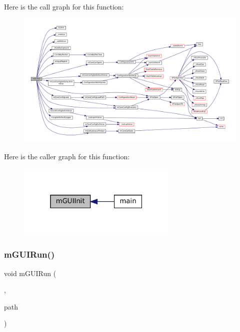 Here is the call graph for this function\+:
\nopagebreak
\begin{figure}[H]
\begin{center}
\leavevmode
\includegraphics[width=350pt]{gui-runner_8h_ad34949b1a8eea99a01dd34345c87f8a4_cgraph}
\end{center}
\end{figure}
Here is the caller graph for this function\+:
\nopagebreak
\begin{figure}[H]
\begin{center}
\leavevmode
\includegraphics[width=217pt]{gui-runner_8h_ad34949b1a8eea99a01dd34345c87f8a4_icgraph}
\end{center}
\end{figure}
\mbox{\label{gui-runner_8h_a857680d78d61544055058419bdca0bed}} 
\subsubsection{\texorpdfstring{m\+G\+U\+I\+Run()}{mGUIRun()}}
{\footnotesize\ttfamily void m\+G\+U\+I\+Run (\begin{DoxyParamCaption}\item[{struct \mbox{\hyperlink{structm_g_u_i_runner}{m\+G\+U\+I\+Runner}} $\ast$}]{,  }\item[{const char $\ast$}]{path }\end{DoxyParamCaption})}

